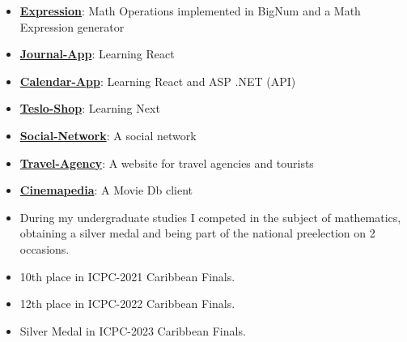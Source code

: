 \documentclass[8pt]{developercv} %
\begin{document}
\begin{minipage}[t]{0.45\textwidth}
	\vspace{-\baselineskip} %
	
	
	\begin{itemize}
		\item {\href{https://github.com/raudel25/Expression}{\textbf{Expression}}: Math Operations implemented in BigNum and a Math Expression generator}
		\item {\href{https://github.com/raudel25/Journal-App}{\textbf{Journal-App}}: Learning React}
		\item {\href{https://github.com/raudel25/Calendar-App}{\textbf{Calendar-App}}: Learning React and ASP .NET (API)}
		\item {\href{https://github.com/raudel25/Calendar-App}{\textbf{Teslo-Shop}}: Learning Next}
		\item {\href{https://github.com/raudel25/social-network}{\textbf{Social-Network}}: A social network}
		\item {\href{https://github.com/Jara-Devs/Travel-Agency}{\textbf{Travel-Agency}}: A website for travel agencies and tourists}
		\item {\href{https://github.com/raudel25/cinemapedia_app}{\textbf{Cinemapedia}}: A Movie Db client}
		      
	\end{itemize}
\end{minipage}
\hfill
\begin{minipage}[t]{0.45\textwidth}
	\vspace{-\baselineskip} %
	
	
	\begin{itemize}
		\item During my undergraduate studies I competed in the subject of mathematics, obtaining a
		      silver medal and being part of the national preelection on 2 occasions.
		\item 10th place in ICPC-2021 Caribbean Finals.
		\item 12th place in ICPC-2022 Caribbean Finals.
		\item Silver Medal in ICPC-2023 Caribbean Finals.
	\end{itemize}
	
\end{minipage}



\end{document}

